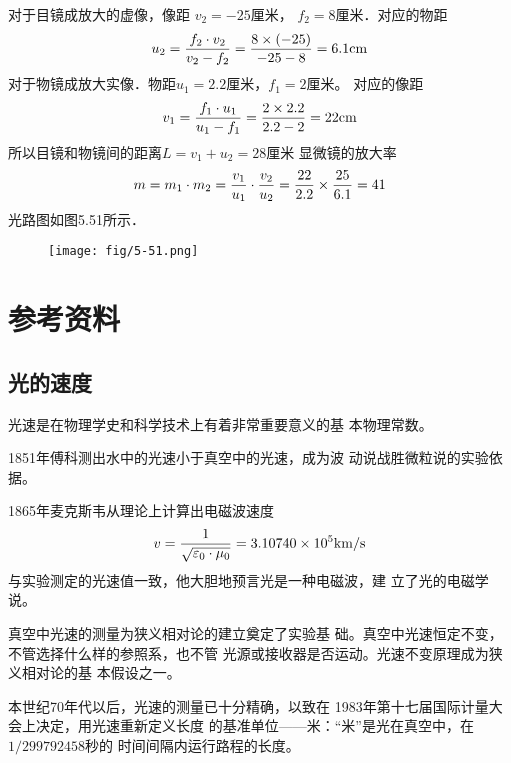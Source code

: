 \begin{enumerate}
\begin{solution}
对于目镜成放大的虚像，像距 $v_2=-25$厘米，
$f_2=8$厘米．对应的物距
\[u_2=\frac{f_2\cdot v_2}{v_2-f_2}=\frac{8\times (-25)}{-25-8}=6.1{\rm cm}\]
对于物镜成放大实像．物距$u_1=2.2$厘米，$f_1=2$厘米。
对应的像距
\[v_1=\frac{f_1\cdot u_1}{u_1-f_1}=\frac{2\times 2.2}{2.2-2}=22{\rm cm}\]
所以目镜和物镜间的距离$L=v_1+u_2=28$厘米
显微镜的放大率
\[m=m_1\cdot m_2=\frac{v_1}{u_1}\cdot \frac{v_2}{u_2}=\frac{22}{2.2}\times\frac{25}{6.1}=41\]
光路图如图5.51所示．
\begin{figure}[htp]
    \centering
    \texttt{[image: fig/5-51.png]}
    \caption{}
\end{figure}
\end{solution}
\end{enumerate}
























\section{参考资料}
\subsection{光的速度}
光速是在物理学史和科学技术上有着非常重要意义的基
本物理常数。

1851年傅科测出水中的光速小于真空中的光速，成为波
动说战胜微粒说的实验依据。

1865年麦克斯韦从理论上计算出电磁波速度
\[v=\frac{1}{\sqrt{\varepsilon_0\cdot \mu_0}}=
3.10740\times10^5{\rm km/s}\]
与实验测定的光速值一致，他大胆地预言光是一种电磁波，建
立了光的电磁学说。

真空中光速的测量为狭义相对论的建立奠定了实验基
础。真空中光速恒定不变，不管选择什么样的参照系，也不管
光源或接收器是否运动。光速不变原理成为狭义相对论的基
本假设之一。

本世纪70年代以后，光速的测量已十分精确，以致在
1983年第十七届国际计量大会上决定，用光速重新定义长度
的基准单位——米：“米”是光在真空中，在$1/299792458$秒的
时间间隔内运行路程的长度。


